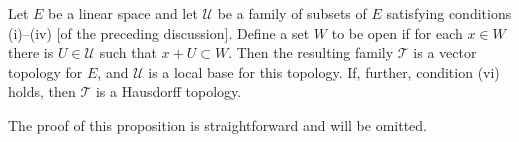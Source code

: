 Let $E$ be a linear space and let $\mathcal{U}$ be a family of subsets of $E$ satisfying conditions (i)--(iv) [of the preceding discussion]. Define a set $W$ to be open if for each $x \in W$ there is $U \in \mathcal{U}$ such that $x + U \subset W$. Then the resulting family $\mathcal{T}$ is a vector topology for $E$, and $\mathcal{U}$ is a local base for this topology. If, further, condition (vi) holds, then $\mathcal{T}$ is a Hausdorff topology.

The proof of this proposition is straightforward and will be omitted.
